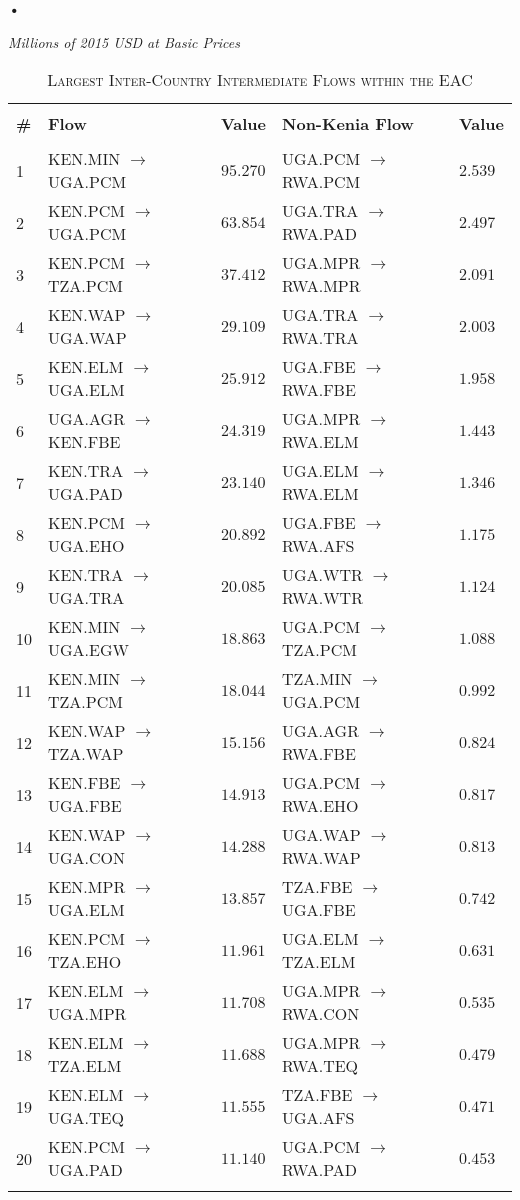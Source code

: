 \textbf{\textbf{•}}\documentclass[a4paper]{article}
\begin{document}
\begin{table}[!htbp] \centering 
  \caption{\textsc{Largest Inter-Country Intermediate Flows within the EAC}} 
  \small{\textit{Millions of 2015 USD at Basic Prices}}
  \label{tab:eaclfl} 
\begin{tabular}{@{\extracolsep{5pt}} lllll} 
\\[-1.8ex]\hline 
\hline \\[-1.8ex] 
\textbf{\#} & \textbf{Flow} & \textbf{Value} & \textbf{Non-Kenia Flow} & \textbf{Value} \\ 
\hline \\[-1.8ex] 
1 & KEN.MIN $\to$ UGA.PCM & $95.270$ & UGA.PCM $\to$ RWA.PCM & $2.539$ \\ 
2 & KEN.PCM $\to$ UGA.PCM & $63.854$ & UGA.TRA $\to$ RWA.PAD & $2.497$ \\ 
3 & KEN.PCM $\to$ TZA.PCM & $37.412$ & UGA.MPR $\to$ RWA.MPR & $2.091$ \\ 
4 & KEN.WAP $\to$ UGA.WAP & $29.109$ & UGA.TRA $\to$ RWA.TRA & $2.003$ \\ 
5 & KEN.ELM $\to$ UGA.ELM & $25.912$ & UGA.FBE $\to$ RWA.FBE & $1.958$ \\ 
6 & UGA.AGR $\to$ KEN.FBE & $24.319$ & UGA.MPR $\to$ RWA.ELM & $1.443$ \\ 
7 & KEN.TRA $\to$ UGA.PAD & $23.140$ & UGA.ELM $\to$ RWA.ELM & $1.346$ \\ 
8 & KEN.PCM $\to$ UGA.EHO & $20.892$ & UGA.FBE $\to$ RWA.AFS & $1.175$ \\ 
9 & KEN.TRA $\to$ UGA.TRA & $20.085$ & UGA.WTR $\to$ RWA.WTR & $1.124$ \\ 
10 & KEN.MIN $\to$ UGA.EGW & $18.863$ & UGA.PCM $\to$ TZA.PCM & $1.088$ \\ 
11 & KEN.MIN $\to$ TZA.PCM & $18.044$ & TZA.MIN $\to$ UGA.PCM & $0.992$ \\ 
12 & KEN.WAP $\to$ TZA.WAP & $15.156$ & UGA.AGR $\to$ RWA.FBE & $0.824$ \\ 
13 & KEN.FBE $\to$ UGA.FBE & $14.913$ & UGA.PCM $\to$ RWA.EHO & $0.817$ \\ 
14 & KEN.WAP $\to$ UGA.CON & $14.288$ & UGA.WAP $\to$ RWA.WAP & $0.813$ \\ 
15 & KEN.MPR $\to$ UGA.ELM & $13.857$ & TZA.FBE $\to$ UGA.FBE & $0.742$ \\ 
16 & KEN.PCM $\to$ TZA.EHO & $11.961$ & UGA.ELM $\to$ TZA.ELM & $0.631$ \\ 
17 & KEN.ELM $\to$ UGA.MPR & $11.708$ & UGA.MPR $\to$ RWA.CON & $0.535$ \\ 
18 & KEN.ELM $\to$ TZA.ELM & $11.688$ & UGA.MPR $\to$ RWA.TEQ & $0.479$ \\ 
19 & KEN.ELM $\to$ UGA.TEQ & $11.555$ & TZA.FBE $\to$ UGA.AFS & $0.471$ \\ 
20 & KEN.PCM $\to$ UGA.PAD & $11.140$ & UGA.PCM $\to$ RWA.PAD & $0.453$ \\ 
\hline \\[-1.8ex] 
\end{tabular} 
\end{table} 
\FloatBarrier
\end{document}
